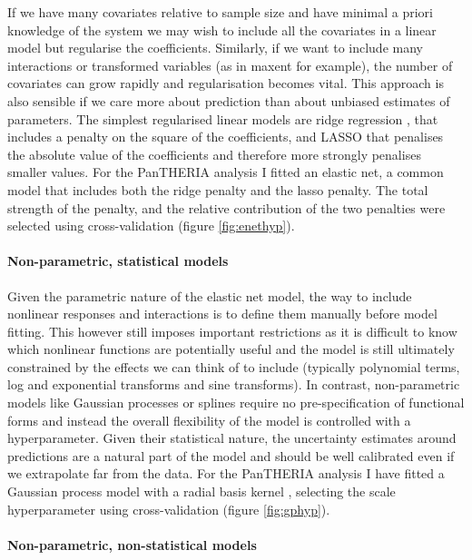 \documentclass[10pt,]{article}
\let\oldparagraph\paragraph
\renewcommand{\paragraph}[1]{\oldparagraph{#1}\mbox{}}
\begin{document}
If we have many covariates relative to sample size and have minimal a priori knowledge of the system we may wish to include all the covariates in a linear model but regularise the coefficients. Similarly, if we want to include many interactions or transformed variables (as in maxent \citep{maxent} for example), the number of covariates can grow rapidly and regularisation becomes vital. This approach is also sensible if we care more about prediction than about unbiased estimates of parameters. The simplest regularised linear models are ridge regression \citep{ridge}, that includes a penalty on the square of the coefficients, and LASSO \citep{tibshirani1996regression} that penalises the absolute value of the coefficients and therefore more strongly penalises smaller values. For the PanTHERIA analysis I fitted an elastic net, a common model that includes both the ridge penalty and the lasso penalty. The total strength of the penalty, and the relative contribution of the two penalties were selected using cross-validation (figure \ref{fig:enethyp}).

\paragraph{Non-parametric, statistical models}\label{non-parametric-statistical-models}

Given the parametric nature of the elastic net model, the way to include nonlinear responses and interactions is to define them manually before model fitting. This however still imposes important restrictions as it is difficult to know which nonlinear functions are potentially useful and the model is still ultimately constrained by the effects we can think of to include (typically polynomial terms, log and exponential transforms and sine transforms). In contrast, non-parametric models like Gaussian processes \citep{rasmussen2004gaussian} or splines \citep{splines} require no pre-specification of functional forms and instead the overall flexibility of the model is controlled with a hyperparameter. Given their statistical nature, the uncertainty estimates around predictions are a natural part of the model and should be well calibrated even if we extrapolate far from the data. For the PanTHERIA analysis I have fitted a Gaussian process model with a radial basis kernel \citep{kernlab}, selecting the scale hyperparameter using cross-validation (figure \ref{fig:gphyp}).

\paragraph{Non-parametric, non-statistical models}\label{non-parametric-non-statistical-models}
\end{document}
